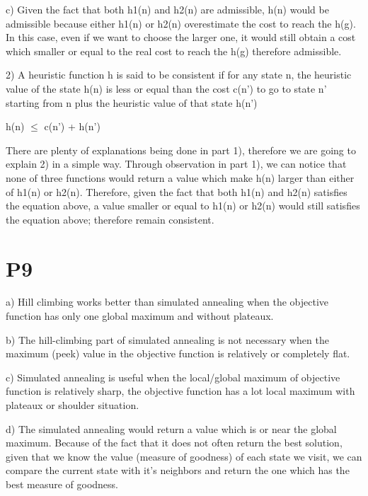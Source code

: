 \documentclass{article}
\begin{document}
c) Given the fact that both h{\small 1(n)} and h{\small 2(n)} are admissible, h{\small (n)} would be admissible because either h{\small 1(n)} or h{\small 2(n)} overestimate the cost to reach the h{\small (g)}. In this case, even if we want to choose the larger one, it would still obtain a cost which smaller or equal to the real cost to reach the h{\small (g)} therefore admissible.

\vspace{5mm}

2) A heuristic function h is said to be consistent if for any state n, the heuristic value of the state h{\small(n)} is less or equal than the cost c{\small(n')} to go to state n' starting from n plus the heuristic value of that state h{\small(n')}

\begin{center}

h{\small(n)} $\le$ c{\small(n')} + h{\small(n')}

\end{center}

There are plenty of explanations being done in part 1), therefore we are going to explain 2) in a simple way. Through observation in part 1), we can notice that none of three functions would return a value which make h{\small(n)} larger than either of h{\small1(n)} or h{\small2(n)}. Therefore, given the fact that both h{\small 1(n)} and h{\small 2(n)} satisfies the equation above, a value smaller or equal to h{\small 1(n)} or h{\small 2(n)} would still satisfies the equation above; therefore remain consistent.

\section*{P9}

\hspace{5mm} 

a) Hill climbing works better than simulated annealing when the objective function has only one global maximum and without plateaux.

b) The hill-climbing part of simulated annealing is not necessary when the maximum (peek) value in the objective function is relatively or completely flat.

c) Simulated annealing is useful when the local/global maximum of objective function is relatively sharp, the objective function has a lot local maximum with plateaux or shoulder situation.

d) The simulated annealing would return a value which is or near the global maximum. Because of the fact that it does not often return the best solution, given that we know the value (measure of goodness) of each state we visit, we can compare the current state with it's neighbors and return the one which has the best measure of goodness.
\end{document}
